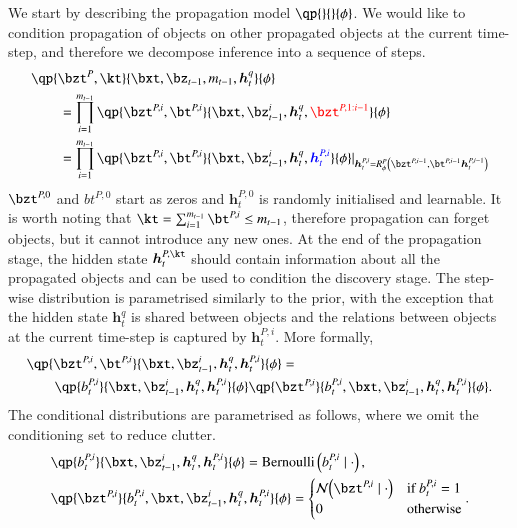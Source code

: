 We start by describing the propagation model $\qp{}{}{\phi}$. We would like to condition propagation of objects on other propagated objects at the current time-step, and therefore we decompose inference into a sequence of steps.
\begin{equation}
\begin{aligned}
    &\qp{\bzt^P, \kt}{\bxt, \bz_{t-1}, m_{t-1}, \bm{h}_t^q}{\phi}\\
%    
    &\qquad= \prod_{i=1}^{m_{t-1}} \qp{\bzt^{P, i}, \bt^{P, i}}{\bxt, \bz_{t-1}^i, \bm{h}_t^q, \textcolor{red}{\bzt^{P, 1:i-1}}}{\phi}\\
%    
    &\qquad= 
    \prod_{i=1}^{m_{t-1}} 
    \qp{\bzt^{P, i}, \bt^{P, i}}{\bxt, \bz_{t-1}^i, \bm{h}_t^q, \textcolor{blue}{\bm{h}_t^{P, i}}}{\phi} 
    \lvert_{
        \bm{h}_t^{P, i} = 
        R_\phi^P 
        \left(  
            \bzt^{P, i-1}, \bt^{P, i-1} \bm{h}_t^{P, i-1} 
        \right)
    }
\end{aligned}
\end{equation}
$\bzt^{P, 0}$ and $bt^{P, 0}$ start as zeros and  $\bm{h}_t^{P, 0}$ is randomly initialised and learnable. It is worth noting that $\kt = \sum_{i=1}^{m_{t-1}} \bt^{P,i} \leq m_{t-1}$, therefore propagation can forget objects, but it cannot introduce any new ones. At the end of the propagation stage, the hidden state $\bm{h}_t^{P, \kt}$ should contain information about all the propagated objects and can be used to condition the discovery stage. The step-wise distribution is parametrised similarly to the prior, with the exception that the hidden state $\bm{h}_t^q$ is shared between objects and the relations between objects at the current time-step is captured by $\bm{h}_t^{P, i}$. More formally,
\begin{equation}
\begin{aligned}
    &\qp{\bzt^{P, i}, \bt^{P, i}}{\bxt, \bz_{t-1}^i, \bm{h}_t^q, \bm{h}_t^{P, i}}{\phi} =\\
%
    &\qquad \qp{b_t^{P, i}}{ \bxt, \bz_{t-1}^i, \bm{h}_t^q, \bm{h}_t^{P, i} }{ \phi }
    \qp{ \bzt^{P, i} }{ b_t^{P, i}, \bxt, \bz_{t-1}^i, \bm{h}_t^q, \bm{h}_t^{P, i} }{ \phi }.
\end{aligned}
\end{equation}
The conditional distributions are parametrised as follows, where we omit the conditioning set to reduce clutter.
\begin{equation}
\begin{aligned}
    &\qp{b_t^{P, i}}{ \bxt, \bz_{t-1}^i, \bm{h}_t^q, \bm{h}_t^{P, i} }{ \phi } = \mathrm{Bernoulli} 
    \left( 
      b_t^{P, i} \mid \cdot
    \right),\\
%  
    &\qp{ \bzt^{P, i} }{ b_t^{P, i}, \bxt, \bz_{t-1}^i, \bm{h}_t^q, \bm{h}_t^{P, i} }{ \phi } = 
    \begin{cases}
      \gauss{\bzt^{P, i} \mid \cdot} & \text{if } b_t^{P, i} = 1\\
      0 & \text{otherwise}
    \end{cases}.
\end{aligned}
\end{equation}

